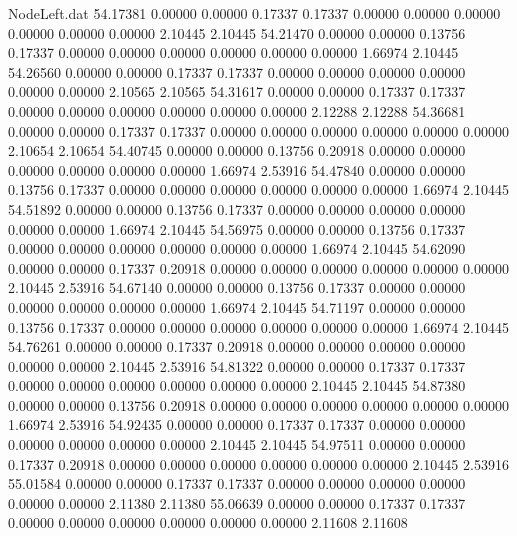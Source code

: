 \begin{filecontents}{NodeLeft.dat}
  54.17381    0.00000    0.00000     0.17337    0.17337    0.00000    0.00000    0.00000    0.00000    0.00000    0.00000    2.10445    2.10445
  54.21470    0.00000    0.00000     0.13756    0.17337    0.00000    0.00000    0.00000    0.00000    0.00000    0.00000    1.66974    2.10445
  54.26560    0.00000    0.00000     0.17337    0.17337    0.00000    0.00000    0.00000    0.00000    0.00000    0.00000    2.10565    2.10565
  54.31617    0.00000    0.00000     0.17337    0.17337    0.00000    0.00000    0.00000    0.00000    0.00000    0.00000    2.12288    2.12288
  54.36681    0.00000    0.00000     0.17337    0.17337    0.00000    0.00000    0.00000    0.00000    0.00000    0.00000    2.10654    2.10654
  54.40745    0.00000    0.00000     0.13756    0.20918    0.00000    0.00000    0.00000    0.00000    0.00000    0.00000    1.66974    2.53916
  54.47840    0.00000    0.00000     0.13756    0.17337    0.00000    0.00000    0.00000    0.00000    0.00000    0.00000    1.66974    2.10445
  54.51892    0.00000    0.00000     0.13756    0.17337    0.00000    0.00000    0.00000    0.00000    0.00000    0.00000    1.66974    2.10445
  54.56975    0.00000    0.00000     0.13756    0.17337    0.00000    0.00000    0.00000    0.00000    0.00000    0.00000    1.66974    2.10445
  54.62090    0.00000    0.00000     0.17337    0.20918    0.00000    0.00000    0.00000    0.00000    0.00000    0.00000    2.10445    2.53916
  54.67140    0.00000    0.00000     0.13756    0.17337    0.00000    0.00000    0.00000    0.00000    0.00000    0.00000    1.66974    2.10445
  54.71197    0.00000    0.00000     0.13756    0.17337    0.00000    0.00000    0.00000    0.00000    0.00000    0.00000    1.66974    2.10445
  54.76261    0.00000    0.00000     0.17337    0.20918    0.00000    0.00000    0.00000    0.00000    0.00000    0.00000    2.10445    2.53916
  54.81322    0.00000    0.00000     0.17337    0.17337    0.00000    0.00000    0.00000    0.00000    0.00000    0.00000    2.10445    2.10445
  54.87380    0.00000    0.00000     0.13756    0.20918    0.00000    0.00000    0.00000    0.00000    0.00000    0.00000    1.66974    2.53916
  54.92435    0.00000    0.00000     0.17337    0.17337    0.00000    0.00000    0.00000    0.00000    0.00000    0.00000    2.10445    2.10445
  54.97511    0.00000    0.00000     0.17337    0.20918    0.00000    0.00000    0.00000    0.00000    0.00000    0.00000    2.10445    2.53916
  55.01584    0.00000    0.00000     0.17337    0.17337    0.00000    0.00000    0.00000    0.00000    0.00000    0.00000    2.11380    2.11380
  55.06639    0.00000    0.00000     0.17337    0.17337    0.00000    0.00000    0.00000    0.00000    0.00000    0.00000    2.11608    2.11608

\end{filecontents}
